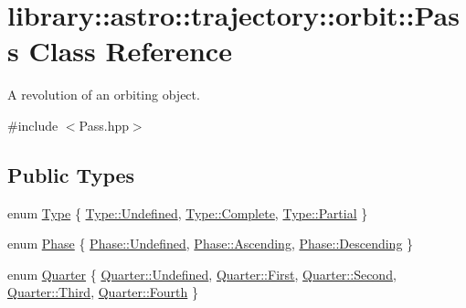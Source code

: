 \hypertarget{classlibrary_1_1astro_1_1trajectory_1_1orbit_1_1_pass}{}\section{library\+:\+:astro\+:\+:trajectory\+:\+:orbit\+:\+:Pass Class Reference}
\label{classlibrary_1_1astro_1_1trajectory_1_1orbit_1_1_pass}


A revolution of an orbiting object.  




{\ttfamily \#include $<$Pass.\+hpp$>$}

\subsection*{Public Types}
\begin{DoxyCompactItemize}
\item 
enum \hyperlink{classlibrary_1_1astro_1_1trajectory_1_1orbit_1_1_pass_aa2a63a39c759bf96a0cc62a6ed3d2ceb}{Type} \{ \hyperlink{classlibrary_1_1astro_1_1trajectory_1_1orbit_1_1_pass_aa2a63a39c759bf96a0cc62a6ed3d2cebaec0fc0100c4fc1ce4eea230c3dc10360}{Type\+::\+Undefined}, 
\hyperlink{classlibrary_1_1astro_1_1trajectory_1_1orbit_1_1_pass_aa2a63a39c759bf96a0cc62a6ed3d2cebaae94f80b3ce82062a5dd7815daa04f9d}{Type\+::\+Complete}, 
\hyperlink{classlibrary_1_1astro_1_1trajectory_1_1orbit_1_1_pass_aa2a63a39c759bf96a0cc62a6ed3d2ceba44ffd38a6dea695cbe2b34efdcc6cf27}{Type\+::\+Partial}
 \}
\item 
enum \hyperlink{classlibrary_1_1astro_1_1trajectory_1_1orbit_1_1_pass_ae0ff0630d4ad5cd97aa3efbc8c8f368b}{Phase} \{ \hyperlink{classlibrary_1_1astro_1_1trajectory_1_1orbit_1_1_pass_ae0ff0630d4ad5cd97aa3efbc8c8f368baec0fc0100c4fc1ce4eea230c3dc10360}{Phase\+::\+Undefined}, 
\hyperlink{classlibrary_1_1astro_1_1trajectory_1_1orbit_1_1_pass_ae0ff0630d4ad5cd97aa3efbc8c8f368bacf3fb1ff52ea1eed3347ac5401ee7f0c}{Phase\+::\+Ascending}, 
\hyperlink{classlibrary_1_1astro_1_1trajectory_1_1orbit_1_1_pass_ae0ff0630d4ad5cd97aa3efbc8c8f368bae3cf5ac19407b1a62c6fccaff675a53b}{Phase\+::\+Descending}
 \}
\item 
enum \hyperlink{classlibrary_1_1astro_1_1trajectory_1_1orbit_1_1_pass_a70c718878e83f059e65788c323eb7900}{Quarter} \{ \newline
\hyperlink{classlibrary_1_1astro_1_1trajectory_1_1orbit_1_1_pass_a70c718878e83f059e65788c323eb7900aec0fc0100c4fc1ce4eea230c3dc10360}{Quarter\+::\+Undefined}, 
\hyperlink{classlibrary_1_1astro_1_1trajectory_1_1orbit_1_1_pass_a70c718878e83f059e65788c323eb7900a7fb55ed0b7a30342ba6da306428cae04}{Quarter\+::\+First}, 
\hyperlink{classlibrary_1_1astro_1_1trajectory_1_1orbit_1_1_pass_a70c718878e83f059e65788c323eb7900ac22cf8376b1893dcfcef0649fe1a7d87}{Quarter\+::\+Second}, 
\hyperlink{classlibrary_1_1astro_1_1trajectory_1_1orbit_1_1_pass_a70c718878e83f059e65788c323eb7900a168909c0b6f1dfbd48f679d47059c1d6}{Quarter\+::\+Third}, 
\newline
\hyperlink{classlibrary_1_1astro_1_1trajectory_1_1orbit_1_1_pass_a70c718878e83f059e65788c323eb7900a6e599f7a2a9186d391be4537f105be98}{Quarter\+::\+Fourth}
 \}
\end{DoxyCompactItemize}
